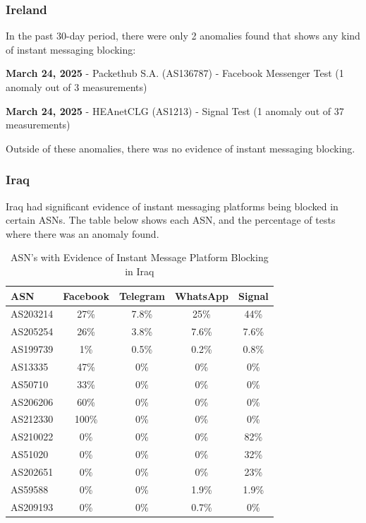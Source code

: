 \subsubsection{Ireland}

In the past 30-day period, there were only 2 anomalies found that shows any kind of instant messaging blocking:

\textbf{March 24, 2025} - Packethub S.A. (AS136787) - Facebook Messenger Test (1 anomaly out of 3 measurements)

\textbf{March 24, 2025} - HEAnetCLG (AS1213) - Signal Test (1 anomaly out of 37 measurements)

Outside of these anomalies, there was no evidence of instant messaging blocking.

\subsubsection{Iraq}

Iraq had significant evidence of instant messaging platforms being blocked in certain ASNs. The table below shows each ASN, and the percentage of tests where there was an anomaly found.

\begin{table}[H]
\centering
\caption{ASN's with Evidence of Instant Message Platform Blocking in Iraq}
\begin{tabular}{lcccc}
\toprule
\textbf{ASN} & \textbf{Facebook} & \textbf{Telegram} & \textbf{WhatsApp} & \textbf{Signal} \\
\midrule
AS203214  & 27\%  & 7.8\% & 25\%  & 44\% \\
AS205254  & 26\%  & 3.8\% & 7.6\% & 7.6\% \\
AS199739  & 1\%   & 0.5\% & 0.2\% & 0.8\% \\
AS13335   & 47\%  & 0\%   & 0\%   & 0\% \\
AS50710   & 33\%  & 0\%   & 0\%   & 0\% \\
AS206206  & 60\%  & 0\%   & 0\%   & 0\% \\
AS212330  & 100\% & 0\%   & 0\%   & 0\% \\
AS210022  & 0\%   & 0\%   & 0\%   & 82\% \\
AS51020   & 0\%   & 0\%   & 0\%   & 32\% \\
AS202651  & 0\%   & 0\%   & 0\%   & 23\% \\
AS59588   & 0\%   & 0\%   & 1.9\% & 1.9\% \\
AS209193  & 0\%   & 0\%   & 0.7\% & 0\% \\
\bottomrule
\end{tabular}
\label{tab:category_block}
\end{table}


